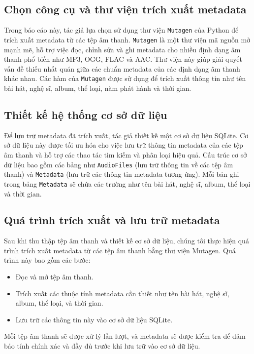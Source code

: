 \documentclass[conference]{IEEEtran}
\begin{document}
\subsection{Chọn công cụ và thư viện trích xuất metadata}
Trong báo cáo này, tác giả lựa chọn sử dụng thư viện \texttt{Mutagen} của Python để trích xuất metadata từ các tệp âm thanh. \texttt{Mutagen} là một thư viện mã nguồn mở mạnh mẽ, hỗ trợ việc đọc, chỉnh sửa và ghi metadata cho nhiều định dạng âm thanh phổ biến như MP3, OGG, FLAC và AAC. Thư viện này giúp giải quyết vấn đề thiếu nhất quán giữa các chuẩn metadata của các định dạng âm thanh khác nhau. Các hàm của \texttt{Mutagen} được sử dụng để trích xuất thông tin như tên bài hát, nghệ sĩ, album, thể loại, năm phát hành và thời gian.

\subsection{Thiết kế hệ thống cơ sở dữ liệu}
Để lưu trữ metadata đã trích xuất, tác giả thiết kế một cơ sở dữ liệu SQLite. Cơ sở dữ liệu này được tối ưu hóa cho việc lưu trữ thông tin metadata của các tệp âm thanh và hỗ trợ các thao tác tìm kiếm và phân loại hiệu quả. Cấu trúc cơ sở dữ liệu bao gồm các bảng như \texttt{AudioFiles} (lưu trữ thông tin về các tệp âm thanh) và \texttt{Metadata} (lưu trữ các thông tin metadata tương ứng). Mỗi bản ghi trong bảng \texttt{Metadata} sẽ chứa các trường như tên bài hát, nghệ sĩ, album, thể loại và thời gian.

\subsection{Quá trình trích xuất và lưu trữ metadata}
Sau khi thu thập tệp âm thanh và thiết kế cơ sở dữ liệu, chúng tôi thực hiện quá trình trích xuất metadata từ các tệp âm thanh bằng thư viện Mutagen. Quá trình này bao gồm các bước:
\begin{itemize}
    \item Đọc và mở tệp âm thanh.
    \item Trích xuất các thuộc tính metadata cần thiết như tên bài hát, nghệ sĩ, album, thể loại, và thời gian.
    \item Lưu trữ các thông tin này vào cơ sở dữ liệu SQLite.
\end{itemize}

Mỗi tệp âm thanh sẽ được xử lý lần lượt, và metadata sẽ được kiểm tra để đảm bảo tính chính xác và đầy đủ trước khi lưu trữ vào cơ sở dữ liệu.
\end{document}
